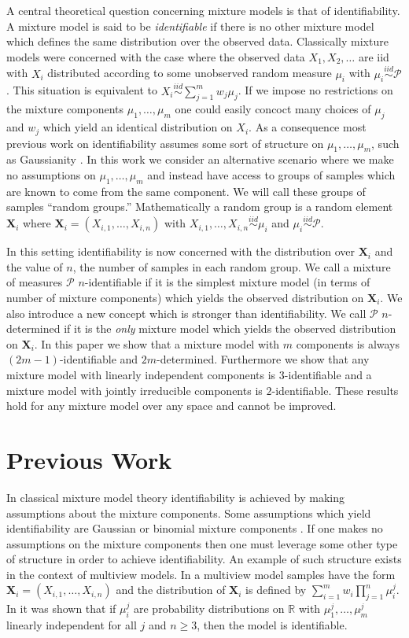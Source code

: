 \documentclass[aos]{imsart}
\def\rn{\mathbb{R}}
\def\r{\right}
\def\sP{\mathscr{P}}
\def\bX{\mathbf{X}}
\def\simiid{\overset{iid}{\sim}}
\theoremstyle{plain}
\theoremstyle{defintion}
\begin{document}
A central theoretical question concerning mixture models is that of identifiability. A mixture model is said to be {\em identifiable} if there is no other mixture model which defines the same distribution over the observed data. Classically mixture models were concerned with the case where the observed data $X_1,X_2,\ldots$ are iid with $X_i$ distributed according to some unobserved random measure $\mu_i$ with $\mu_i\simiid \sP$. This situation is equivalent to $X_i \simiid \sum_{j=1}^m w_j \mu_j$. If we impose no restrictions on the mixture components $\mu_1,\ldots,\mu_m$ one could easily concoct many choices of $\mu_j$ and $w_j$ which yield an identical distribution on $X_i$. As a consequence most previous work on identifiability assumes some sort of structure on $\mu_1,\ldots,\mu_m$, such as Gaussianity \cite{anderson14,bruni85}. In this work we consider an alternative scenario where we make no assumptions on $\mu_1,\ldots,\mu_m$ and instead have access to groups of samples which are known to come from the same component. We will call these groups of samples ``random groups.'' Mathematically a random group is a random element $\bX_i$ where $\bX_i = \left( X_{i,1},\ldots,X_{i,n} \right)$ with $X_{i,1},\ldots,X_{i,n}\simiid \mu_i$ and $\mu_i \simiid \sP$.

In this setting identifiability is now concerned with the distribution over $\bX_i$ and the value of $n$, the number of samples in each random group. We call a mixture of measures $\sP$ $n$-identifiable if it is the simplest mixture model (in terms of number of mixture components) which yields the observed distribution on $\bX_i$. We also introduce a new concept which is stronger than identifiability. We call $\sP$ $n$-determined if it is the {\em only} mixture model which yields the observed distribution on $\bX_i$. In this paper we show that a mixture model with $m$ components is always $\left(2m-1\r)$-identifiable and $2m$-determined. Furthermore we show that any mixture model with linearly independent components is $3$-identifiable and a mixture model with jointly irreducible components is $2$-identifiable. These results hold for any mixture model over any space and cannot be improved.
	\section{Previous Work}
	In classical mixture model theory identifiability is achieved by making assumptions about the mixture components. Some assumptions which yield identifiability are Gaussian or binomial mixture components \cite{bruni85,teicher63}. If one makes no assumptions on the mixture components then one must leverage some other type of structure in order to achieve identifiability. An example of such structure exists in the context of multiview models. In a multiview model samples have the form $\bX_i = \left( X_{i,1},\ldots, X_{i,n} \right)$ and the distribution of $\bX_i$ is defined by $\sum_{i=1}^m w_i \prod_{j=1}^n \mu_i^j$. In \cite{allman09} it was shown that if $\mu_i^j$ are probability distributions on $\rn$ with $\mu_1^j,\ldots,\mu_m^j$ linearly independent for all $j$ and $n\ge 3$, then the model is identifiable.
\end{document}
